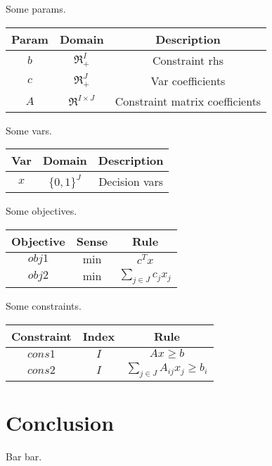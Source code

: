 \documentclass{article}
\begin{document}
Some params.
\begin{tabular}{c|c|c} \label{tab:param}
    Param & Domain & Description \\
    \hline
    $b$ & $\Re^I_+$ & Constraint rhs \\
    $c$ & $\Re^J_+$ & Var coefficients \\
    $A$ & $\Re^{I \times J}$ & Constraint matrix coefficients \\
\end{tabular}

Some vars.
\begin{tabular}{c|c|c} \label{tab:var}
    Var & Domain & Description \\
    \hline
    $x$ & $\{0, 1\}^J$ & Decision vars \\
\end{tabular}

Some objectives.
\begin{tabular}{c|c|c} \label{tab:objective}
    Objective & Sense & Rule \\
    \hline
    $obj1$ & $\min$ & $c^Tx$ \\
    $obj2$ & $\min$ & $\sum_{j \in J} c_j x_j$ \\
\end{tabular}

Some constraints.
\begin{tabular}{c|c|c} \label{tab:constraint}
    Constraint & Index & Rule \\
    \hline
    $cons1$ & $I$ & $Ax \geq b$ \\
    $cons2$ & $I$ & $\sum_{j \in J} A_{ij} x_j \geq b_i$ \\
\end{tabular}

\section{Conclusion}
Bar bar.
\end{document}

